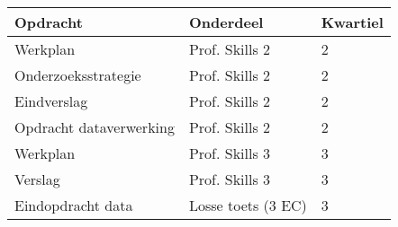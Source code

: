 \begin{table}[h]
\begin{tabular}{|l|l|l|}
\hline
\rowcolor{saxion} 
\textbf{Opdracht}       & \textbf{Onderdeel} & \textbf{Kwartiel} \\\hline
Werkplan                & Prof. Skills 2     & 2                 \\\hline
Onderzoeksstrategie     & Prof. Skills 2     & 2                 \\\hline
Eindverslag             & Prof. Skills 2     & 2                 \\\hline
Opdracht dataverwerking & Prof. Skills 2     & 2                 \\\hline
Werkplan                & Prof. Skills 3     & 3                 \\\hline
Verslag                 & Prof. Skills 3     & 3                 \\\hline
Eindopdracht data       & Losse toets (3 EC) & 3                 \\\hline
\end{tabular}
\end{table}
